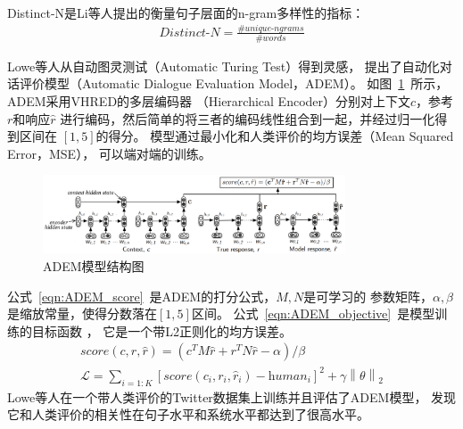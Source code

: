 Distinct-N是Li等人提出的衡量句子层面的n-gram多样性的指标：
\begin{align}
    \textit{Distinct-N} = \frac{\#\textit{unique-ngrams}}{\#\textit{words}}
\end{align}

Lowe等人从自动图灵测试（Automatic Turing Test）得到灵感，
提出了自动化对话评价模型（Automatic Dialogue Evaluation Model，ADEM）。
如图~\ref{fig:ADEM_model}~所示，ADEM采用VHRED的多层编码器
（Hierarchical Encoder）分别对上下文$c$，参考$r$和响应$\hat{r}$
进行编码，然后简单的将三者的编码线性组合到一起，并经过归一化得到区间在
$[1, 5]$的得分。
模型通过最小化和人类评价的均方误差（Mean Squared Error，MSE），
可以端对端的训练。
\begin{figure}[H]
    \centering
    \includegraphics[width=0.8\textwidth]{figure/ADEM.pdf}
    \caption{ADEM模型结构图}
    \label{fig:ADEM_model}
\end{figure}

公式~\ref{eqn:ADEM_score}~是ADEM的打分公式，$M, N$是可学习的
参数矩阵，$\alpha, \beta$是缩放常量，使得分数落在$[1, 5]$区间。
公式~\ref{eqn:ADEM_objective}~是模型训练的目标函数 ，
它是一个带L2正则化的均方误差。
\begin{align}
    \textit{score}(c, r, \hat{r}) = (c^T M \hat{r} + r^T N \hat{r} - \alpha) / \beta
    \label{eqn:ADEM_score} \\
    \mathcal{L} = \sum_{i=1:K} [\textit{score}(c_i, r_i, \hat{r}_i) - \textit{human}_i]^2 + \gamma \left\| \theta \right\| _2
    \label{eqn:ADEM_objective}
\end{align}
Lowe等人在一个带人类评价的Twitter数据集上训练并且评估了ADEM模型，
发现它和人类评价的相关性在句子水平和系统水平都达到了很高水平。


